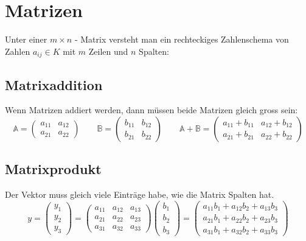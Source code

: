 \documentclass[9pt,a4paper]{article}
\begin{document}
    \section{Matrizen}
    Unter einer $m \times n$ - Matrix versteht man ein rechteckiges
    Zahlenschema von Zahlen $a_{ij} \in K$ mit $m$ Zeilen und $n$ Spalten:
    \subsection{Matrixaddition}
    Wenn Matrizen addiert werden, dann müssen beide Matrizen gleich gross sein:
    \[
    \mathbb{A}=
    \begin{pmatrix}
        a_{11} & a_{12} \\
        a_{21} & a_{22}
    \end{pmatrix}
    \qquad
    \mathbb{B}=
    \begin{pmatrix}
        b_{11} & b_{12} \\
        b_{21} & b_{22}
    \end{pmatrix}
    \qquad
    \mathbb{A}+\mathbb{B}=
    \begin{pmatrix}
        a_{11}+b_{11} & a_{12}+b_{12} \\
        a_{21}+b_{21} & a_{22}+b_{22}
    \end{pmatrix}
    \]
    
    \subsection{Matrixprodukt}
    Der Vektor muss gleich viele Einträge habe, wie die Matrix Spalten hat.
    \[
    y =
    \begin{pmatrix}
        y_{1} \\
        y_{2} \\
        y_{3}
    \end{pmatrix}
    =
    \begin{pmatrix}
        a_{11} & a_{12} & a_{13} \\
        a_{21} & a_{22} & a_{23} \\
        a_{31} & a_{32} & a_{33}
    \end{pmatrix}
    \begin{pmatrix}
        b_{1} \\
        b_{2} \\
        b_{3}
    \end{pmatrix}
    =
    \begin{pmatrix}
        a_{11}b_1 + a_{12}b_2 + a_{13}b_3 \\
        a_{21}b_1 + a_{22}b_2 + a_{23}b_3 \\
        a_{31}b_1 + a_{32}b_2 + a_{33}b_3
    \end{pmatrix}
    \]
    
\end{document}
